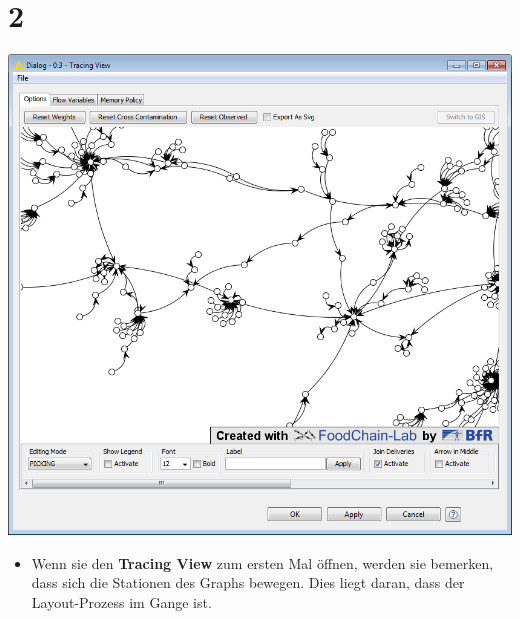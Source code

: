 \documentclass{beamer}
\begin{document}
\section{2}
\begin{frame}
	\begin{center}
  		\includegraphics[height=0.6\textheight]{2.png}
	\end{center}
	\begin{itemize}
		\item Wenn sie den \textbf{Tracing View} zum ersten Mal öffnen, werden sie bemerken, dass sich die Stationen des Graphs bewegen. Dies liegt daran, dass der Layout-Prozess im Gange ist.
	\end{itemize}
\end{frame}
\end{document}
